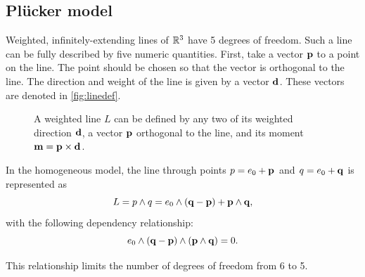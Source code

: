 \subsection{Pl\"ucker model}
\label{sec:hongbo}
\label{sec:plucker}


Weighted, infinitely-extending lines of $\mathbb{R}^3$ have 5 degrees of freedom.  Such a line can be fully described by five numeric quantities. First, take a vector $\mathbf{p}$ to a point on the line.  The point should be chosen so that the vector is orthogonal to the line.  The direction and weight of the line is given by a vector $\mathbf{d}$.  These vectors are denoted in \autoref{fig:linedef}.

\begin{figure}
  \caption{A weighted line $L$ can be defined by any two of its weighted direction $\mathbf{d}$, a vector $\mathbf{p}$ orthogonal to the line, and its moment $\mathbf{m} = \mathbf{p} \times \mathbf{d}$.}
  \label{fig:linedef}
  \begin{center}
  \end{center}
\end{figure}

In the homogeneous model, the line through points $p = e_0 + \mathbf{p}$ and $q = e_0 + \mathbf{q}$ is represented as 
\begin{equation*}
  L = p \wedge q = e_0 \wedge (\mathbf{q} - \mathbf{p}) + \mathbf{p} \wedge \mathbf{q} ,
\end{equation*}
with the following dependency relationship: 
\begin{equation} \label{eq:gaplucker0} 
  e_0 \wedge (\mathbf{q} - \mathbf{p}) \wedge (\mathbf{p} \wedge \mathbf{q}) = 0 .
\end{equation}

This relationship limits the number of degrees of freedom from 6 to 5.


